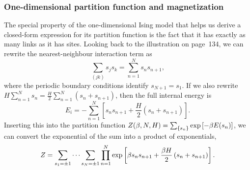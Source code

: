 \subsubsection{One-dimensional partition function and magnetization}
The special property of the one-dimensional Ising model that helps us derive a closed-form expression for its partition function is the fact that it has exactly as many links as it has sites.
Looking back to the illustration on page~134, we can rewrite the nearest-neighbour interaction term as
\begin{equation*}
  \sum_{(jk)} s_j s_k = \sum_{n = 1}^N s_n s_{n + 1},
\end{equation*}
where the periodic boundary conditions identify $s_{N + 1} = s_1$.
If we also rewrite $H \sum_{n = 1}^N s_n = \frac{H}{2} \sum_{n = 1}^N \left(s_n + s_{n + 1}\right)$, then the full internal energy is
\begin{equation*}
  E_i = -\sum_{n = 1}^N \left[s_n s_{n + 1} + \frac{H}{2}\left(s_n + s_{n + 1}\right)\right].
\end{equation*}
Inserting this into the partition function $Z(\beta, N, H) = \sum_{\left\{s_n\right\}} \exp\left[-\beta E(s_n)\right]$, we can convert the exponential of the sum into a product of exponentials,
\begin{equation*}
  Z = \sum_{s_1 = \pm 1} \cdots \sum_{s_N = \pm 1} \prod_{n = 1}^N \exp\left[\beta s_n s_{n + 1} + \frac{\beta H}{2}\left(s_n + s_{n + 1}\right)\right].
\end{equation*}

